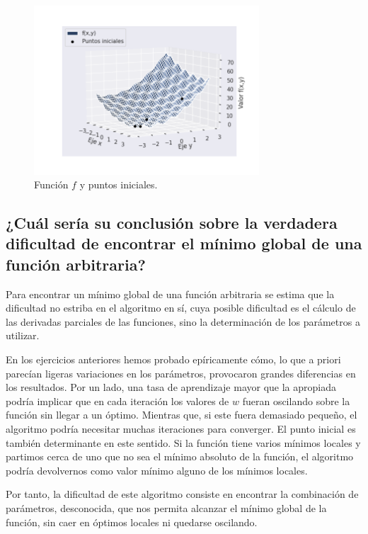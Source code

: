 \documentclass[a4paper, 20pt]{article}
\begin{document}
\begin{figure}[H]
    \centering
    \includegraphics[width=0.75\textwidth]{f1+pts}
    \caption{Función $f$ y puntos iniciales.}
    \label{fig:f1+pts}
\end{figure}


\subsection{¿Cuál sería su conclusión sobre la verdadera dificultad de encontrar el mínimo
global de una función arbitraria?}

Para encontrar un mínimo global de una función arbitraria se estima que la dificultad no estriba en el algoritmo en sí, cuya posible dificultad es el cálculo de las derivadas parciales de las funciones, sino la determinación de los parámetros a utilizar.

En los ejercicios anteriores hemos probado epíricamente cómo, lo que a priori parecían ligeras variaciones en los parámetros, provocaron grandes diferencias en los resultados. Por un lado,  una tasa de aprendizaje mayor que la apropiada podría implicar que en cada iteración los valores de $w$ fueran oscilando sobre la función sin llegar a un óptimo. Mientras que, si este fuera demasiado pequeño, el algoritmo podría necesitar muchas iteraciones para converger. El punto inicial es también determinante en este sentido. Si la función tiene varios mínimos locales y partimos cerca de uno que no sea el mínimo absoluto de la función, el algoritmo podría devolvernos como valor mínimo alguno de los mínimos locales.

Por tanto, la dificultad de este algoritmo consiste en encontrar la combinación de parámetros, desconocida, que nos permita alcanzar el mínimo global de la función, sin caer en óptimos locales ni quedarse oscilando.
\newpage
\end{document}
